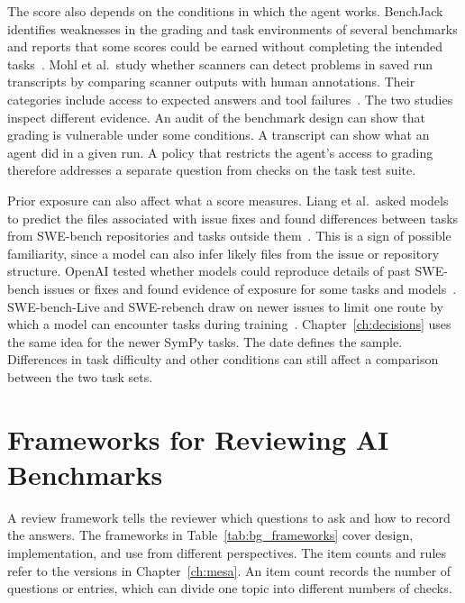The score also depends on the conditions in which the agent works. BenchJack identifies weaknesses in the grading and task environments of several benchmarks and reports that some scores could be earned without completing the intended tasks~\cite{wang_benchjack_2026}. Mohl et al.\ study whether scanners can detect problems in saved run transcripts by comparing scanner outputs with human annotations. Their categories include access to expected answers and tool failures~\cite{mohl_transcript_flaws_2026}. The two studies inspect different evidence. An audit of the benchmark design can show that grading is vulnerable under some conditions. A transcript can show what an agent did in a given run. A policy that restricts the agent's access to grading therefore addresses a separate question from checks on the task test suite.

Prior exposure can also affect what a score measures. Liang et al.\ asked models to predict the files associated with issue fixes and found differences between tasks from SWE-bench repositories and tasks outside them~\cite{liang_swebench_illusion_2025}. This is a sign of possible familiarity, since a model can also infer likely files from the issue or repository structure. OpenAI tested whether models could reproduce details of past SWE-bench issues or fixes and found evidence of exposure for some tasks and models~\cite{openai_swebench_verified_contamination_2025}. SWE-bench-Live and SWE-rebench draw on newer issues to limit one route by which a model can encounter tasks during training~\cite{zhang_swebench_live_2025,badertdinov_swe_rebench_2025}. Chapter~\ref{ch:decisions} uses the same idea for the newer SymPy tasks. The date defines the sample. Differences in task difficulty and other conditions can still affect a comparison between the two task sets.

\section{Frameworks for Reviewing AI Benchmarks}
\label{sec:bg_frameworks}

A review framework tells the reviewer which questions to ask and how to record the answers. The frameworks in Table~\ref{tab:bg_frameworks} cover design, implementation, and use from different perspectives. The item counts and rules refer to the versions in Chapter~\ref{ch:mesa}. An item count records the number of questions or entries, which can divide one topic into different numbers of checks.

